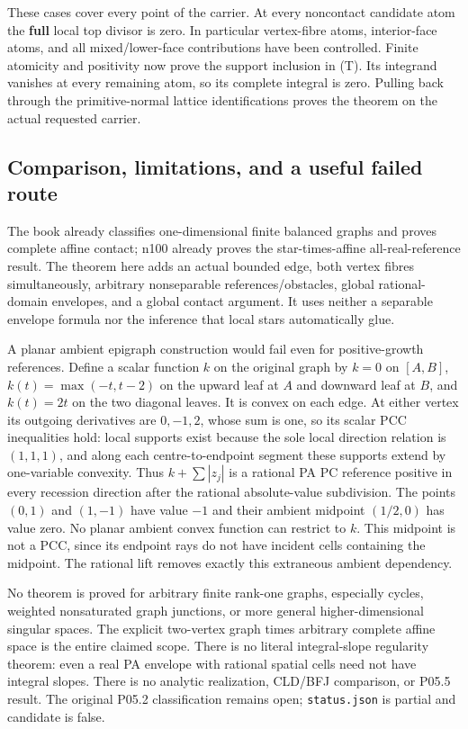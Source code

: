 \documentclass[
  11pt,
]{article}
\begin{document}
These cases cover every point of the carrier. At every noncontact
candidate atom the \textbf{full} local top divisor is zero. In
particular vertex-fibre atoms, interior-face atoms, and all
mixed/lower-face contributions have been controlled. Finite atomicity
and positivity now prove the support inclusion in (T). Its integrand
vanishes at every remaining atom, so its complete integral is zero.
Pulling back through the primitive-normal lattice identifications proves
the theorem on the actual requested carrier.

\subsection{Comparison, limitations, and a useful failed
route}\label{comparison-limitations-and-a-useful-failed-route}

The book already classifies one-dimensional finite balanced graphs and
proves complete affine contact; n100 already proves the
star-times-affine all-real-reference result. The theorem here adds an
actual bounded edge, both vertex fibres simultaneously, arbitrary
nonseparable references/obstacles, global rational-domain envelopes, and
a global contact argument. It uses neither a separable envelope formula
nor the inference that local stars automatically glue.

A planar ambient epigraph construction would fail even for
positive-growth references. Define a scalar function \(k\) on the
original graph by \(k=0\) on \([A,B]\), \(k(t)=\max(-t,t-2)\) on the
upward leaf at \(A\) and downward leaf at \(B\), and \(k(t)=2t\) on the
two diagonal leaves. It is convex on each edge. At either vertex its
outgoing derivatives are \(0,-1,2\), whose sum is one, so its scalar PCC
inequalities hold: local supports exist because the sole local direction
relation is \((1,1,1)\), and along each centre-to-endpoint segment these
supports extend by one-variable convexity. Thus \(k+\sum|z_j|\) is a
rational PA PC reference positive in every recession direction after the
rational absolute-value subdivision. The points \((0,1)\) and \((1,-1)\)
have value \(-1\) and their ambient midpoint \((1/2,0)\) has value zero.
No planar ambient convex function can restrict to \(k\). This midpoint
is not a PCC, since its endpoint rays do not have incident cells
containing the midpoint. The rational lift removes exactly this
extraneous ambient dependency.

No theorem is proved for arbitrary finite rank-one graphs, especially
cycles, weighted nonsaturated graph junctions, or more general
higher-dimensional singular spaces. The explicit two-vertex graph times
arbitrary complete affine space is the entire claimed scope. There is no
literal integral-slope regularity theorem: even a real PA envelope with
rational spatial cells need not have integral slopes. There is no
analytic realization, CLD/BFJ comparison, or P05.5 result. The original
P05.2 classification remains open; \texttt{status.json} is partial and
candidate is false.
\end{document}
